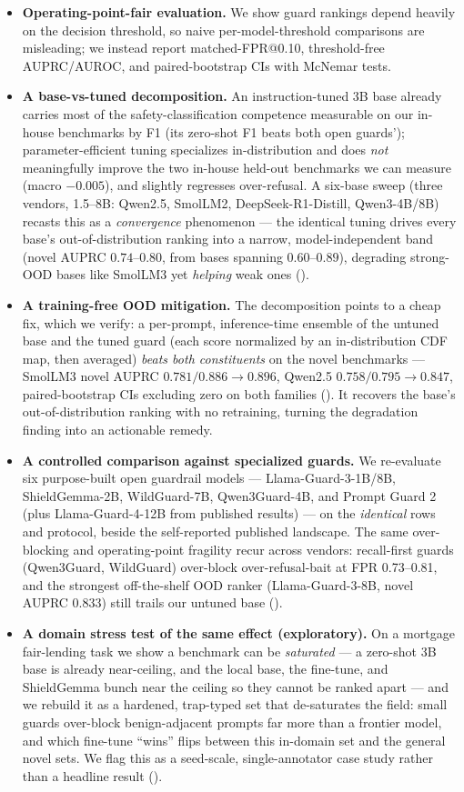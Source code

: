 \documentclass[sigconf,nonacm]{acmart}
\begin{document}
\begin{itemize}
  \item \textbf{Operating-point-fair evaluation.} We show guard rankings depend heavily on the decision threshold, so naive per-model-threshold comparisons are misleading; we instead report matched-FPR@0.10, threshold-free AUPRC/AUROC, and paired-bootstrap CIs with McNemar tests.
  \item \textbf{A base-vs-tuned decomposition.} An instruction-tuned 3B base already carries most of the safety-classification competence measurable on our in-house benchmarks by F1 (its zero-shot F1 beats both open guards'); parameter-efficient tuning specializes in-distribution and does \emph{not} meaningfully improve the two in-house held-out benchmarks we can measure (macro $-0.005$), and slightly regresses over-refusal. A six-base sweep (three vendors, 1.5--8B: Qwen2.5, SmolLM2, DeepSeek-R1-Distill, Qwen3-4B/8B) recasts this as a \emph{convergence} phenomenon --- the identical tuning drives every base's out-of-distribution ranking into a narrow, model-independent band (novel AUPRC $0.74$--$0.80$, from bases spanning $0.60$--$0.89$), degrading strong-OOD bases like SmolLM3 yet \emph{helping} weak ones ().
  \item \textbf{A training-free OOD mitigation.} The decomposition points to a cheap fix, which we verify: a per-prompt, inference-time ensemble of the untuned base and the tuned guard (each score normalized by an in-distribution CDF map, then averaged) \emph{beats both constituents} on the novel benchmarks --- SmolLM3 novel AUPRC $0.781/0.886 \to 0.896$, Qwen2.5 $0.758/0.795 \to 0.847$, paired-bootstrap CIs excluding zero on both families (). It recovers the base's out-of-distribution ranking with no retraining, turning the degradation finding into an actionable remedy.
  \item \textbf{A controlled comparison against specialized guards.} We re-evaluate six purpose-built open guardrail models --- Llama-Guard-3-1B/8B, ShieldGemma-2B, WildGuard-7B, Qwen3Guard-4B, and Prompt Guard 2 (plus Llama-Guard-4-12B from published results) --- on the \emph{identical} rows and protocol, beside the self-reported published landscape. The same over-blocking and operating-point fragility recur across vendors: recall-first guards (Qwen3Guard, WildGuard) over-block over-refusal-bait at FPR 0.73--0.81, and the strongest off-the-shelf OOD ranker (Llama-Guard-3-8B, novel AUPRC 0.833) still trails our untuned base ().
  \item \textbf{A domain stress test of the same effect (exploratory).} On a mortgage fair-lending task we show a benchmark can be \emph{saturated} --- a zero-shot 3B base is already near-ceiling, and the local base, the fine-tune, and ShieldGemma bunch near the ceiling so they cannot be ranked apart --- and we rebuild it as a hardened, trap-typed set that de-saturates the field: small guards over-block benign-adjacent prompts far more than a frontier model, and which fine-tune ``wins'' flips between this in-domain set and the general novel sets. We flag this as a seed-scale, single-annotator case study rather than a headline result ().

\end{itemize}
\end{document}
